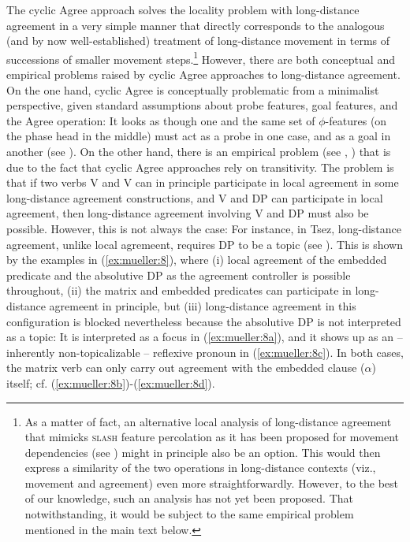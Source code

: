 \documentclass[output=paper
,modfonts
,nonflat]{langsci/langscibook}
\begin{document}
	The cyclic Agree approach solves the locality problem with long-distance agreement in a very simple manner that directly
	corresponds to the analogous (and by now well-established) treatment
	of long-distance movement in terms of successions of smaller movement
	steps.\footnote{As a matter of fact, an alternative local analysis of long-distance agreement that mimicks {\scshape slash} feature percolation as it has been proposed for movement dependencies (see \citealt{Gazdar:81}) might in principle also be an option. This would then express a similarity of the two operations in long-distance contexts (viz., movement and agreement) even more straightforwardly. However, to the best of our knowledge, such an analysis has not yet been proposed. That notwithstanding, it would be subject to the same empirical problem mentioned in the main text below.}  However, there are both conceptual and empirical problems
	raised by cyclic Agree approaches to long-distance agreement. On the
	one hand, cyclic Agree is conceptually problematic from a minimalist
	perspective, given standard assumptions about probe features, goal
	features, and the Agree operation: It looks as though one and the same
	set of $\phi$-features (on the phase head in the middle) must act as a
	probe in one case, and as a goal in another (see \citealt{Bhatt:05}). On
	the other hand, there is an empirical problem (see
	\citealt{PolinskyPotsdam:01}, \citealt{BhattKeine:16:lon}) that is due to the
	fact that cyclic Agree approaches rely on transitivity. The problem is
	that if two verbs V and V can in principle participate in local
	agreement in some long-distance agreement constructions, and V and
	DP can participate in local agreement, then long-distance
	agreement involving V and DP must also be possible. However,
	this is not always the  case: For instance,  in Tsez, long-distance
	agreement, unlike local agremeent, requires DP to
	be a topic (see \citealt{PolinskyPotsdam:01}). This is shown by the
	examples in (\ref{ex:mueller:8}), where (i) local agreement of the embedded predicate and
	the absolutive DP as the agreement controller is possible throughout,
	(ii) the matrix and embedded predicates can participate in
	long-distance agremeent in principle, but (iii) long-distance
	agreement in this configuration is blocked nevertheless because the
	absolutive DP is not interpreted as a topic: It is interpreted as a
	focus in (\ref{ex:mueller:8a}), and it shows up as an -- inherently
	non-topicalizable -- reflexive pronoun in (\ref{ex:mueller:8c}). In both cases, the
	matrix verb can only carry out agreement with the embedded clause
	($\alpha$) itself; cf. (\ref{ex:mueller:8b})-(\ref{ex:mueller:8d}). 
	
\end{document}
